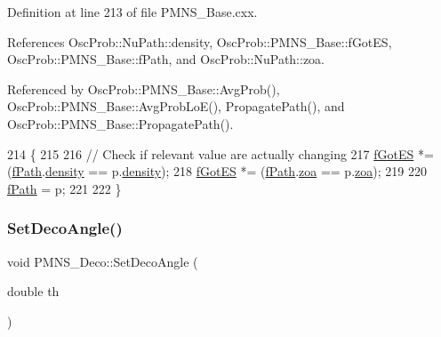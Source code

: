 Definition at line 213 of file P\+M\+N\+S\+\_\+\+Base.\+cxx.



References Osc\+Prob\+::\+Nu\+Path\+::density, Osc\+Prob\+::\+P\+M\+N\+S\+\_\+\+Base\+::f\+Got\+ES, Osc\+Prob\+::\+P\+M\+N\+S\+\_\+\+Base\+::f\+Path, and Osc\+Prob\+::\+Nu\+Path\+::zoa.



Referenced by Osc\+Prob\+::\+P\+M\+N\+S\+\_\+\+Base\+::\+Avg\+Prob(), Osc\+Prob\+::\+P\+M\+N\+S\+\_\+\+Base\+::\+Avg\+Prob\+Lo\+E(), Propagate\+Path(), and Osc\+Prob\+::\+P\+M\+N\+S\+\_\+\+Base\+::\+Propagate\+Path().


\begin{DoxyCode}
214 \{
215 
216   \textcolor{comment}{// Check if relevant value are actually changing}
217   \hyperlink{classOscProb_1_1PMNS__Base_a6dc5cd010d2d70b2324745b4e53e9839}{fGotES} *= (\hyperlink{classOscProb_1_1PMNS__Base_a849437aa8891fe042e86886ce8f81c6e}{fPath}.\hyperlink{structOscProb_1_1NuPath_a54ddd451db69bc54434de3cf18a117ca}{density} == p.\hyperlink{structOscProb_1_1NuPath_a54ddd451db69bc54434de3cf18a117ca}{density});
218   \hyperlink{classOscProb_1_1PMNS__Base_a6dc5cd010d2d70b2324745b4e53e9839}{fGotES} *= (\hyperlink{classOscProb_1_1PMNS__Base_a849437aa8891fe042e86886ce8f81c6e}{fPath}.\hyperlink{structOscProb_1_1NuPath_af3213f3691ba83c6bc05f4a3490f6b31}{zoa} == p.\hyperlink{structOscProb_1_1NuPath_af3213f3691ba83c6bc05f4a3490f6b31}{zoa});
219 
220   \hyperlink{classOscProb_1_1PMNS__Base_a849437aa8891fe042e86886ce8f81c6e}{fPath} = p;
221 
222 \}
\end{DoxyCode}
\mbox{\label{classOscProb_1_1PMNS__Deco_a35e79054682aa88c55f4350c29336014}} 
\subsubsection{\texorpdfstring{Set\+Deco\+Angle()}{SetDecoAngle()}}
{\footnotesize\ttfamily void P\+M\+N\+S\+\_\+\+Deco\+::\+Set\+Deco\+Angle (\begin{DoxyParamCaption}\item[{double}]{th }\end{DoxyParamCaption})\hspace{0.3cm}{\ttfamily [virtual]}}

